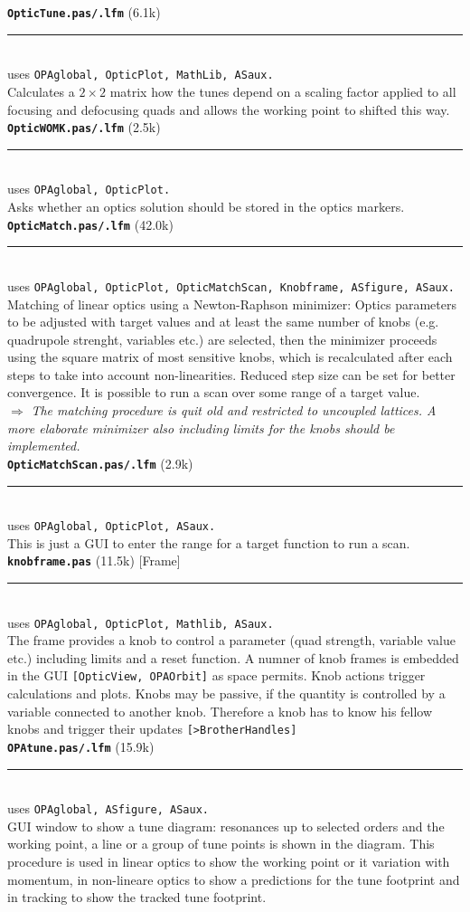 \documentclass[12pt]{article}
\newcommand\todo[1]{$\Longrightarrow$ {\em #1} }
\newcommand\code[1]{{\tt [#1]}}
\newcommand\opamodule[3]{{\bf \tt #1} #2\\  \rule[3pt]{\textwidth}{0.2pt} \\ {\scriptsize uses \tt  #3}\\[1ex]}
\begin{document}
\opamodule{OpticTune.pas/.lfm}{(6.1k)}{OPAglobal,  OpticPlot, MathLib, ASaux.}
Calculates a $2\times 2$ matrix how the tunes depend on a scaling factor applied to all focusing and defocusing quads and allows the working point to shifted this way.\\

\opamodule{OpticWOMK.pas/.lfm}{(2.5k)}{OPAglobal,  OpticPlot.}
Asks whether an optics solution should be stored in the optics markers.\\

\opamodule{OpticMatch.pas/.lfm}{(42.0k)}{OPAglobal, OpticPlot, OpticMatchScan, Knobframe, ASfigure, ASaux.}
Matching of linear optics using a Newton-Raphson minimizer: Optics parameters to be adjusted with target values and at least the same number of knobs (e.g. quadrupole strenght, variables etc.) are selected, then the minimizer proceeds using the square matrix of most sensitive knobs, which is recalculated after each steps to take into account non-linearities. Reduced step size can be set for better convergence. It is possible to run a scan over some range of a target value.\\
\todo{The matching procedure is quit old and restricted to uncoupled lattices. A more elaborate minimizer also including limits for the knobs should be implemented.}\\

\opamodule{OpticMatchScan.pas/.lfm}{(2.9k)}{OPAglobal,  OpticPlot, ASaux.}
This is just a GUI to enter the range for a target function to run a scan.\\

\opamodule{knobframe.pas}{(11.5k) [Frame] }{OPAglobal, OpticPlot, Mathlib, ASaux.}
The frame provides a knob to control a parameter (quad strength, variable value etc.) including limits and a reset function. A numner of knob frames is embedded in the GUI \code{OpticView, OPAOrbit} as space permits. Knob actions trigger calculations and plots. Knobs may be passive, if the quantity is controlled by a variable connected to another knob. Therefore a knob has to know his fellow knobs and trigger their updates \code{>BrotherHandles}\\

\opamodule{OPAtune.pas/.lfm}{(15.9k)}{OPAglobal, ASfigure, ASaux.}
GUI window to show a tune diagram: resonances up to selected orders and the working point, a line or a group of tune points is shown in the diagram. This procedure is used in linear optics to show the working point or it variation with momentum, in non-lineare optics to show a predictions for the tune footprint and in tracking to show the tracked tune footprint.\\
\end{document}
